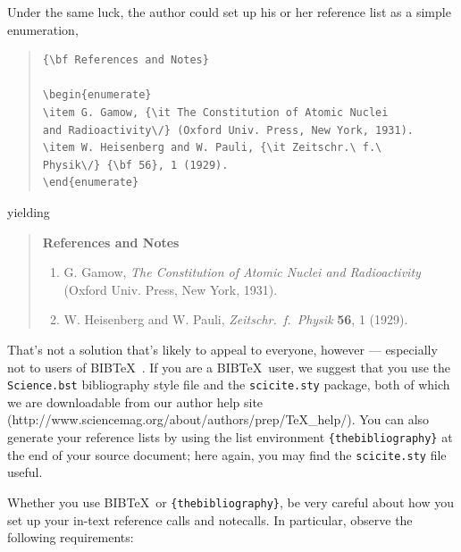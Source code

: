 \documentclass[12pt]{article}
\begin{document}
Under the same luck, the author could set up his or her reference list as a simple enumeration,

\begin{quote}
\begin{verbatim}
{\bf References and Notes}

\begin{enumerate}
\item G. Gamow, {\it The Constitution of Atomic Nuclei
and Radioactivity\/} (Oxford Univ. Press, New York, 1931).
\item W. Heisenberg and W. Pauli, {\it Zeitschr.\ f.\ 
Physik\/} {\bf 56}, 1 (1929).
\end{enumerate}
\end{verbatim}
\end{quote}

\noindent yielding

\begin{quote}
{\bf References and Notes}

\begin{enumerate}
\item G. Gamow, {\it The Constitution of Atomic Nuclei and
Radioactivity\/} (Oxford Univ. Press, New York, 1931).
\item W. Heisenberg and W. Pauli, {\it Zeitschr.\ f.\ Physik} {\bf 56},
1 (1929).
\end{enumerate}
\end{quote}

That's not a solution that's likely to appeal to everyone, however ---
especially not to users of B{\small{IB}}\TeX\ \cite{inclme}.  If you
are a B{\small{IB}}\TeX\ user, we suggest that you use the
\texttt{Science.bst} bibliography style file and the
\texttt{scicite.sty} package, both of which we are downloadable from our author help site
(http://www.sciencemag.org/about/authors/prep/TeX\_help/).  You can also
generate your reference lists by using the list environment
\texttt{\{thebibliography\}} at the end of your source document; here
again, you may find the \texttt{scicite.sty} file useful.

Whether you use B{\small{IB}}\TeX\ or \texttt{\{thebibliography\}}, be
very careful about how you set up your in-text reference calls and
notecalls.  In particular, observe the following requirements:
\end{document}
